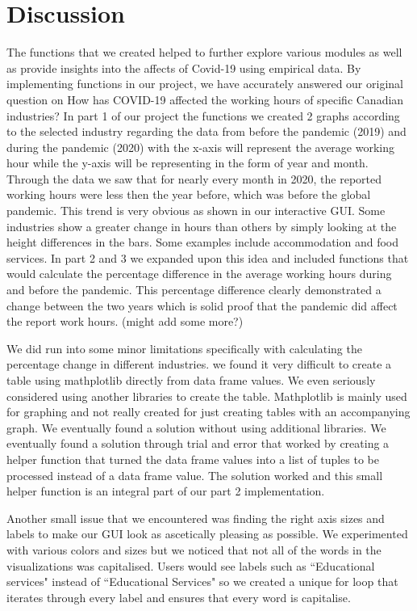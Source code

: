 \documentclass[fontsize=11pt]{article}
\begin{document}
\section*{Discussion} 

The functions that we created helped to further explore various modules as well as provide insights into the affects of Covid-19 using empirical data. By implementing functions in our project, we have accurately answered our original question on How has COVID-19 affected the working hours of specific Canadian industries? In part 1 of our project the functions we created 2 graphs according to the selected industry regarding the data
from before the pandemic (2019) and during the pandemic (2020) with the x-axis will represent the average working hour while the y-axis
will be representing in the form of year and month. Through the data we saw that for nearly every month in 2020, the reported working hours were less then the year before, which was before the global pandemic. This trend is very obvious as shown in our interactive GUI. Some industries show a greater change in hours than others by simply looking at the height differences in the bars. Some examples include accommodation and food services. In part 2 and 3 we expanded upon this idea and included functions that would calculate the percentage difference in the average working hours during and before the pandemic. This percentage difference clearly demonstrated a change between the two years which is solid proof that the pandemic did affect the report work hours.  (might add some more?)


\medskip


We did run into some minor limitations specifically with calculating the percentage change in different industries. we found it very difficult to create a table using mathplotlib directly from data frame values. We even seriously considered using another libraries  to create the table. Mathplotlib is mainly used for graphing and not really created for just creating tables with an accompanying graph. We eventually found a solution without using additional libraries. We eventually found a solution through trial and error that worked by creating a helper function that turned the data frame values into a list of tuples to be processed instead of a data frame value. The solution worked and this small helper function is an integral part of our part 2 implementation.

Another small issue that we encountered was finding the right axis sizes and labels to make our GUI look as ascetically pleasing as possible. We experimented with various colors and sizes but we noticed that not all of the words in the visualizations was capitalised. Users would see labels such as ``Educational services" instead of ``Educational Services" so we created a unique for loop that iterates through every label and ensures that every word is capitalise.
\end{document}

